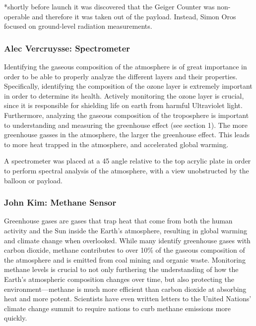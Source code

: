 \documentclass[12pt,]{article}
\begin{document}
*shortly before launch it was discovered that the Geiger Counter was
non-operable and therefore it was taken out of the payload. Instead,
Simon Oros focused on ground-level radiation measurements.

\subsubsection{Alec Vercruysse:
Spectrometer}\label{alec-vercruysse-spectrometer}

Identifying the gaseous composition of the atmosphere is of great
importance in order to be able to properly analyze the different layers
and their properties. Specifically, identifying the composition of the
ozone layer is extremely important in order to determine its health.
Actively monitoring the ozone layer is crucial, since it is responsible
for shielding life on earth from harmful Ultraviolet light. Furthermore,
analyzing the gaseous composition of the troposphere is important to
understanding and measuring the greenhouse effect (see section 1). The
more greenhouse gasses in the atmosphere, the larger the greenhouse
effect. This leads to more heat trapped in the atmosphere, and
accelerated global warming.

A spectrometer was placed at a 45 \degree angle relative to the top
acrylic plate in order to perform spectral analysis of the atmosphere,
with a view unobstructed by the balloon or payload.

\subsubsection{John Kim: Methane Sensor}\label{john-kim-methane-sensor}

Greenhouse gases are gases that trap heat that come from both the human
activity and the Sun inside the Earth's atmosphere, resulting in global
warming and climate change when overlooked. While many identify
greenhouse gases with carbon dioxide, methane contributes to over 10\%
of the gaseous composition of the atmosphere and is emitted from coal
mining and organic waste. Monitoring methane levels is crucial to not
only furthering the understanding of how the Earth's atmospheric
composition changes over time, but also protecting the
environment---methane is much more efficient than carbon dioxide at
absorbing heat and more potent. Scientists have even written letters to
the United Nations' climate change summit to require nations to curb
methane emissions more quickly.
\end{document}
